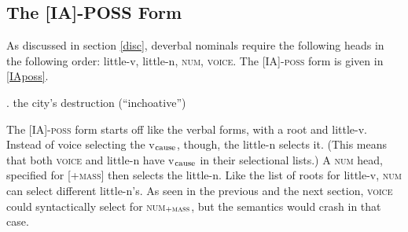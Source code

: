 \documentclass[12pt]{article}
\newcommand*{\textsub}[1]{\ensuremath{_\textrm{{\scriptsize #1}}}}
\begin{document}
\subsection{The [IA]-POSS Form}\label{strucs2}

As discussed in section \ref{disc}, deverbal nominals require the following heads in the following order: little-v, little-n, \textsc{num}, \textsc{voice}. The [IA]-\textsc{poss} form is given in \ref{IAposs}.

\singlespacing

\ex. \label{IAposs} the city's destruction (``inchoative'')

\vspace*{-10pt}
\par \hfill \par
\doublespacing

\noindent The [IA]-\textsc{poss} form starts off like the verbal forms, with a root and little-v. Instead of voice selecting the v\textsub{cause}, though, the little-n selects it. (This means that both \textsc{voice} and little-n have v\textsub{cause} in their selectional lists.) A \textsc{num} head, specified for [+\textsc{mass}] then selects the little-n. Like the list of roots for little-v, \textsc{num} can select different little-n's. As seen in the previous and the next section, \textsc{voice} could syntactically select for \textsc{num}\textsub{\textsc{+mass}}, but the semantics would crash in that case.
\end{document}
